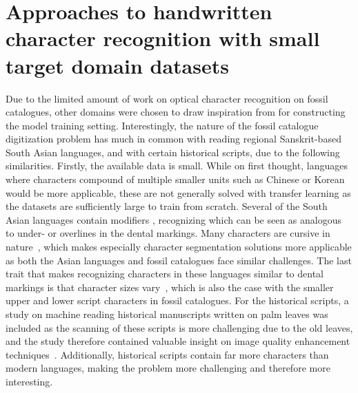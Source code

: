 \documentclass[english,twoside,openright]{UH_DS_MSc}
\begin{document}
\section{Approaches to handwritten character recognition with small target domain datasets}
\label{sect:same_solution}

Due to the limited amount of work on optical character recognition on fossil catalogues, other 
domains were chosen to draw inspiration from for constructing the model training setting. 
Interestingly, the nature of the fossil catalogue digitization problem has much in common with 
reading regional Sanskrit-based South Asian languages, and with certain historical 
scripts, due to the following similarities.
Firstly, the available data is small. While on first thought, languages where characters compound of
 multiple smaller units such as  Chinese or Korean would be more applicable, these are not
  generally solved with transfer learning as the datasets are sufficiently large to train from scratch.
Several of the South Asian languages contain modifiers \cite{2limbachiyaGujarati,3chatterjeeBengali,5rasheedHandwrittenUrduWAlexNet},
recognizing which can be seen as analogous to under- or overlines in the dental markings.
Many characters are cursive in nature~\cite{5rasheedHandwrittenUrduWAlexNet}, which makes
 especially character segmentation 
solutions more applicable as both the Asian languages and fossil catalogues face similar challenges.
The last trait that makes recognizing characters in these languages similar to dental markings is that character sizes vary~\cite{6shoponBangla},
which is also the case with the smaller upper and lower script characters in fossil catalogues.
For the historical scripts, a study on machine reading historical manuscripts written on palm leaves was 
included as the scanning of these scripts is more challenging due to the old leaves, and the 
study therefore contained valuable insight on image quality enhancement techniques~\cite{9thuonPalm}. Additionally, historical scripts 
contain far more characters than modern languages, making the problem more challenging and therefore more interesting.
\end{document}
